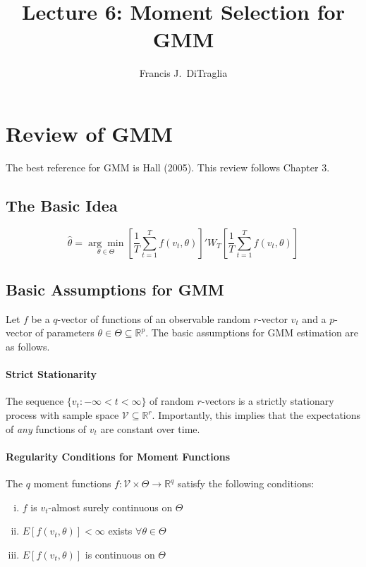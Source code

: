 \documentclass[12pt]{article}
\theoremstyle{definition}
\begin{document}
\title{Lecture 6: Moment Selection for GMM}

\author{Francis J.\ DiTraglia}

\maketitle 

\section{Review of GMM}
The best reference for GMM is Hall (2005). This review follows Chapter 3.
\subsection{The Basic Idea}
	$$\widehat{\theta} = \underset{\theta \in \Theta}{\arg \min} \left[\frac{1}{T}\sum_{t=1}^T f(v_t, \theta)\right]' W_T \left[ \frac{1}{T}\sum_{t=1}^T f(v_t, \theta)\right]$$

\subsection{Basic Assumptions for GMM}
Let $f$ be a $q$-vector of functions of an observable random $r$-vector $v_t$ and a $p$-vector of parameters $\theta \in \Theta \subseteq \mathbb{R}^p$. The basic assumptions for GMM estimation are as follows.

\paragraph{Strict Stationarity} The sequence $\{v_t\colon -\infty <t <\infty\}$ of random $r$-vectors is a strictly stationary process with sample space $\mathcal{V}\subseteq \mathbb{R}^r$. Importantly, this implies that the expectations of \emph{any} functions of $v_t$ are constant over time.

\paragraph{Regularity Conditions for Moment Functions}
The $q$ moment functions $f\colon \mathcal{V}\times \Theta \rightarrow \mathbb{R}^q$ satisfy the following conditions:
	\begin{enumerate}[(i)]
		\item $f$ is $v_t$-almost surely continuous on $\Theta$
		\item $E[f(v_t, \theta)]<\infty$ exists $\forall \theta \in \Theta$
		\item $E[f(v_t,\theta)]$ is continuous on $\Theta$
	\end{enumerate}
\end{document}
